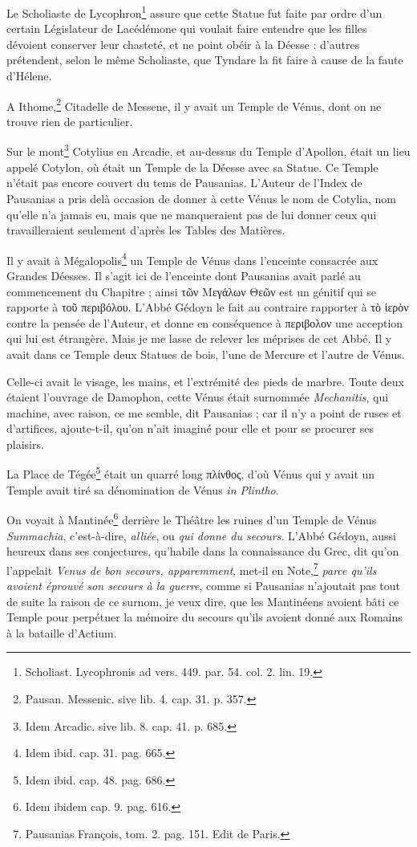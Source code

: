 \documentclass[a4paper, 11pt, oneside, polutonikogreek, french]{article}
\begin{document}
Le Scholiaste de Lycophron\footnote{Scholiast. Lycophronis ad vers. 449. par. 54. col. 2. lin. 19.} assure que cette Statue fut faite par ordre d'un certain Législateur de Lacédémone qui voulait faire entendre que les filles dévoient conserver leur chasteté, et ne point obéir à la Déesse : d'autres prétendent, selon le même Scholiaste, que Tyndare la fit faire à cause de la faute d'Hélene.

A Ithome,\footnote{Pausan. Messenic. sive lib. 4. cap. 31. p. 357.} Citadelle de Messene, il y avait un Temple de Vénus, dont on ne trouve rien de particulier.

Sur le mont\footnote{Idem Arcadic. sive lib. 8. cap. 41. p. 685.} Cotylius en Arcadie, et au-dessus du Temple d'Apollon, était un lieu appelé Cotylon, où était un Temple de la Déesse avec sa Statue. Ce Temple n'était pas encore couvert du tems de Pausanias. L'Auteur de l'Index de Pausanias a pris delà occasion de donner à cette Vénus le nom de Cotylia, nom qu'elle n'a jamais eu, mais que ne manqueraient pas de lui donner ceux qui travailleraient seulement d'après les Tables des Matières.

Il y avait à Mégalopolis\footnote{Idem ibid. cap. 31. pag. 665.} un Temple de Vénus dans l'enceinte consacrée aux Grandes Déesses. Il s'agit ici de l'enceinte dont Pausanias avait parlé au commencement du Chapitre ; ainsi τῶν Μεγάλων Θεῶν est un génitif qui se rapporte à τοῦ περιβόλου. L'Abbé Gédoyn le fait au contraire rapporter à τὸ ἱερὸν contre la pensée de l'Auteur, et donne en conséquence à περιβολον une acception qui lui est étrangère. Mais je me lasse de relever les méprises de cet Abbé. Il y avait dans ce Temple deux Statues de bois, l'une de Mercure et l'autre de Vénus.

Celle-ci avait le visage, les mains, et l'extrémité des pieds de marbre. Toute deux étaient l'ouvrage de Damophon, cette Vénus était surnommée \emph{Mechanitis}, qui machine, avec raison, ce me semble, dit Pausanias ; car il n'y a point de ruses et d'artifices, ajoute-t-il, qu'on n'ait imaginé pour elle et pour se procurer ses plaisirs.

La Place de Tégée\footnote{Idem ibid. cap. 48. pag. 686.} était un quarré long πλίνθος, d'où Vénus qui y avait un Temple avait tiré sa dénomination de Vénus \emph{in Plintho}.

On voyait à Mantinée\footnote{Idem ibidem cap. 9. pag. 616.} derrière le Théâtre les ruines d'un Temple de Vénus \emph{Summachia}, c'est-à-dire, \emph{alliée}, ou \emph{qui donne du secours}. L'Abbé Gédoyn, aussi heureux dans ses conjectures, qu'habile dans la connaissance du Grec, dit qu'on l'appelait \emph{Venus de bon secours, apparemment}, met-il en Note,\footnote{Pausanias François, tom. 2. pag. 151. Edit de Paris.} \emph{parce qu'ils avoient éprouvé son secours à la guerre}, comme si Pausanias n'ajoutait pas tout de suite la raison de ce surnom, je veux dire, que les Mantinéens avoient bâti ce Temple pour perpétuer la mémoire du secours qu'ils avoient donné aux Romains à la bataille d'Actium.
\end{document}
